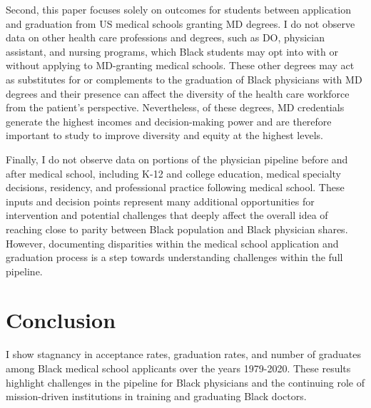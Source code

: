 \documentclass[12pt]{article}
\begin{document}
Second, this paper focuses solely on outcomes for students between application and graduation from US medical schools granting MD degrees. I do not observe data on other health care professions and degrees, such as DO, physician assistant, and nursing programs, which Black students may opt into with or without applying to MD-granting medical schools. These other degrees may act as substitutes for or complements to the graduation of Black physicians with MD degrees and their presence can affect the diversity of the health care workforce from the patient's perspective. Nevertheless, of these degrees, MD credentials generate the highest incomes and decision-making power and are therefore important to study to improve diversity and equity at the highest levels. 

Finally, I do not observe data on portions of the physician pipeline before and after medical school, including K-12 and college education, medical specialty decisions, residency, and professional practice following medical school. These inputs and decision points represent many additional opportunities for intervention and potential challenges that deeply affect the overall idea of reaching close to parity between Black population and Black physician shares. However, documenting disparities within the medical school application and graduation process is a step towards understanding challenges within the full pipeline. 

\section{Conclusion}

I show stagnancy in acceptance rates, graduation rates, and number of graduates among Black medical school applicants over the years 1979-2020. These results highlight challenges in the pipeline for Black physicians and the continuing role of mission-driven institutions in training and graduating Black doctors. 


\clearpage

\singlespacing
\setlength\bibsep{6pt}






\clearpage
\end{document}
